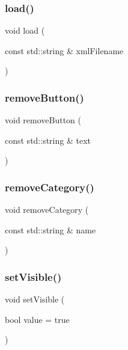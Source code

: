 \mbox{\label{classGInputPanel_a52bd48893438cece88605e4dcb2cb67a}} 
\subsubsection{\texorpdfstring{load()}{load()}}
{\footnotesize\ttfamily void load (\begin{DoxyParamCaption}\item[{const std\+::string \&}]{xml\+Filename }\end{DoxyParamCaption})}

\mbox{\label{classGInputPanel_a5ed3beebe80709d3fb661016fd090f18}} 
\subsubsection{\texorpdfstring{remove\+Button()}{removeButton()}}
{\footnotesize\ttfamily void remove\+Button (\begin{DoxyParamCaption}\item[{const std\+::string \&}]{text }\end{DoxyParamCaption})}

\mbox{\label{classGInputPanel_a8ba2189afec64ec160945832c5f64a8d}} 
\subsubsection{\texorpdfstring{remove\+Category()}{removeCategory()}}
{\footnotesize\ttfamily void remove\+Category (\begin{DoxyParamCaption}\item[{const std\+::string \&}]{name }\end{DoxyParamCaption})}

\mbox{\label{classGInputPanel_acf3237f534b3039d9ff3bcd9abc77800}} 
\subsubsection{\texorpdfstring{set\+Visible()}{setVisible()}}
{\footnotesize\ttfamily void set\+Visible (\begin{DoxyParamCaption}\item[{bool}]{value = {\ttfamily true} }\end{DoxyParamCaption})}

